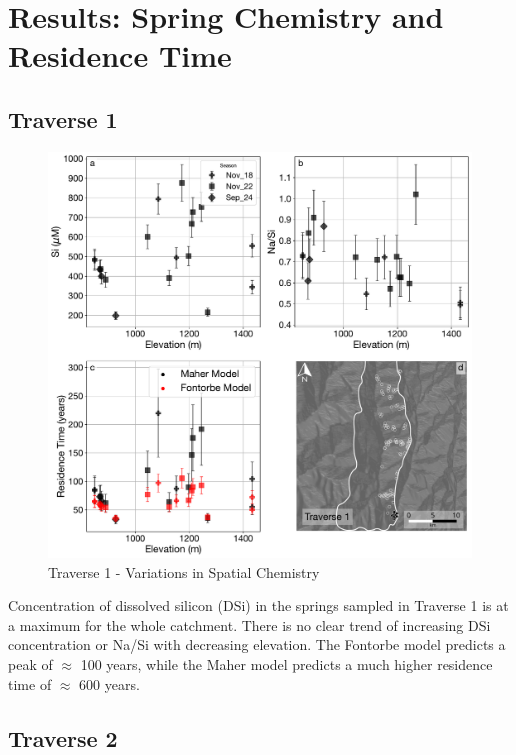 
\section{Results: Spring Chemistry and Residence Time}

\subsection{Traverse 1}

\begin{figure}[h]
    \centering
        \includegraphics[width=\textwidth]{Traverse_1_summary.pdf}
    \caption{Traverse 1 - Variations in Spatial Chemistry}
    \label{fig:spatial_changes_spring1}
\end{figure}

\FloatBarrier

Concentration of dissolved silicon (DSi) in the springs sampled in Traverse 1 is at a maximum for the whole catchment. There is no clear trend of increasing DSi concentration or Na/Si with decreasing elevation. The Fontorbe model predicts a peak of $\approx$ 100 years, while the Maher model predicts a much higher residence time of $\approx$ 600 years. 




\newpage

\subsection{Traverse 2}

